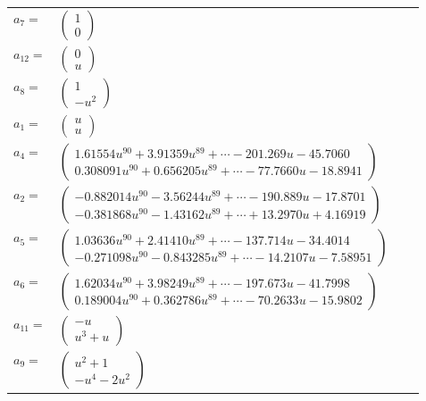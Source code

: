 \documentclass[1p]{elsarticle_modified}
\theoremstyle{definition}
\begin{document}
\begin{tabular}{m{7pt} m{180pt} m{7pt} m{180pt} }
\flushright $a_{7}=$&$\begin{pmatrix}1\\0\end{pmatrix}$ \\
\flushright $a_{12}=$&$\begin{pmatrix}0\\u\end{pmatrix}$ \\
\flushright $a_{8}=$&$\begin{pmatrix}1\\- u^2\end{pmatrix}$ \\
\flushright $a_{1}=$&$\begin{pmatrix}u\\u\end{pmatrix}$ \\
\flushright $a_{4}=$&$\begin{pmatrix}1.61554 u^{90}+3.91359 u^{89}+\cdots-201.269 u-45.7060\\0.308091 u^{90}+0.656205 u^{89}+\cdots-77.7660 u-18.8941\end{pmatrix}$ \\
\flushright $a_{2}=$&$\begin{pmatrix}-0.882014 u^{90}-3.56244 u^{89}+\cdots-190.889 u-17.8701\\-0.381868 u^{90}-1.43162 u^{89}+\cdots+13.2970 u+4.16919\end{pmatrix}$ \\
\flushright $a_{5}=$&$\begin{pmatrix}1.03636 u^{90}+2.41410 u^{89}+\cdots-137.714 u-34.4014\\-0.271098 u^{90}-0.843285 u^{89}+\cdots-14.2107 u-7.58951\end{pmatrix}$ \\
\flushright $a_{6}=$&$\begin{pmatrix}1.62034 u^{90}+3.98249 u^{89}+\cdots-197.673 u-41.7998\\0.189004 u^{90}+0.362786 u^{89}+\cdots-70.2633 u-15.9802\end{pmatrix}$ \\
\flushright $a_{11}=$&$\begin{pmatrix}- u\\u^3+u\end{pmatrix}$ \\
\flushright $a_{9}=$&$\begin{pmatrix}u^2+1\\- u^4-2 u^2\end{pmatrix}$ \\

\end{tabular}
\end{document}
